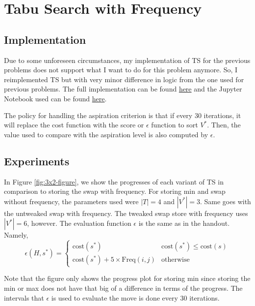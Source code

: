 \section{Tabu Search with Frequency}

\subsection{Implementation}

Due to some unforeseen circumstances, my implementation of TS for the previous problems does not support what I want to do for this problem anymore. So, I reimplemented TS but with very minor difference in logic from the one used for previous problems. The full implementation can be found \href{https://github.com/nngerncham/ma395_heuristic/blob/main/homework/hw3/codebase/tabu_search/p4.py}{here} and the Jupyter Notebook used can be found \href{https://github.com/nngerncham/ma395_heuristic/blob/main/homework/hw3/codebase/Notebooks/Problem\%204.ipynb}{here}.

The policy for handling the aspiration criterion is that if every 30 iterations, it will replace the cost function with the score or \(\epsilon\) function to sort \(V^*\). Then, the value used to compare with the aspiration level is also computed by \(\epsilon\).

\subsection{Experiments}

In Figure \ref{fig:3x2-figure}, we show the progresses of each variant of TS in comparison to storing the swap with frequency. For storing min and swap without frequency, the parameters used were \(|T| = 4\) and \(|V^*| = 3\). Same goes with the untweaked swap with frequency. The tweaked swap store with frequency uses \(|V^*| = 6\), however. The evaluation function \(\epsilon\) is the same as in the handout. Namely,
\[
    \epsilon(H, s^*) = \begin{cases}
        \text{cost}(s^*) & \text{cost}(s^*) \leq \text{cost}(s) \\
        \text{cost}(s^*) + 5 \times \text{Freq}(i, j) & \text{otherwise}
    \end{cases}
\]

Note that the figure only shows the progress plot for storing min since storing the min or max does not have that big of a difference in terms of the progress. The intervals that \(\epsilon\) is used to evaluate the move is done every 30 iterations.

